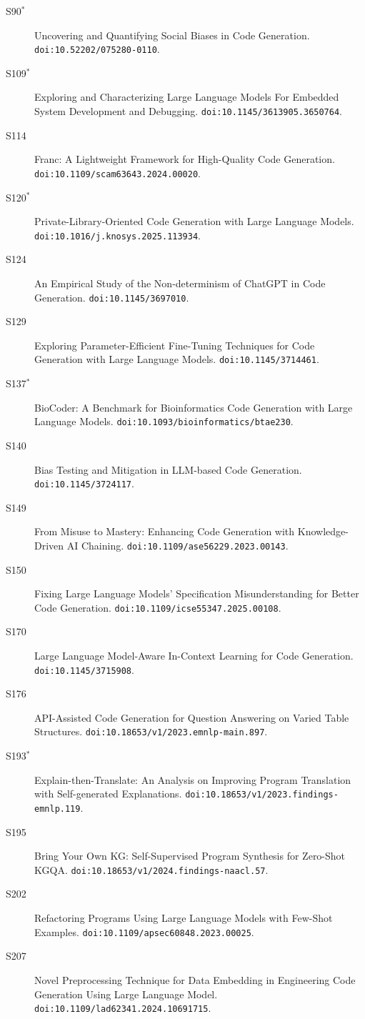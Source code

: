 {\begin{description}
\item[S90$^\ast$] Uncovering and Quantifying Social Biases in Code Generation. \texttt{doi:10.52202/075280-0110}.
\item[S109$^\ast$] Exploring and Characterizing Large Language Models For Embedded System Development and Debugging. \texttt{doi:10.1145/3613905.3650764}.
\item[S114] Franc: A Lightweight Framework for High-Quality Code Generation. \texttt{doi:10.1109/scam63643.2024.00020}.
\item[S120$^\ast$] Private-Library-Oriented Code Generation with Large Language Models. \texttt{doi:10.1016/j.knosys.2025.113934}.
\item[S124] An Empirical Study of the Non-determinism of ChatGPT in Code Generation. \texttt{doi:10.1145/3697010}.
\item[S129] Exploring Parameter-Efficient Fine-Tuning Techniques for Code Generation with Large Language Models. \texttt{doi:10.1145/3714461}.
\item[S137$^\ast$] BioCoder: A Benchmark for Bioinformatics Code Generation with Large Language Models. \texttt{doi:10.1093/bioinformatics/btae230}.
\item[S140] Bias Testing and Mitigation in LLM-based Code Generation. \texttt{doi:10.1145/3724117}.
\item[S149] From Misuse to Mastery: Enhancing Code Generation with Knowledge-Driven AI Chaining. \texttt{doi:10.1109/ase56229.2023.00143}.
\item[S150] Fixing Large Language Models' Specification Misunderstanding for Better Code Generation. \texttt{doi:10.1109/icse55347.2025.00108}.
\item[S170] Large Language Model-Aware In-Context Learning for Code Generation. \texttt{doi:10.1145/3715908}.
\item[S176] API-Assisted Code Generation for Question Answering on Varied Table Structures. \texttt{doi:10.18653/v1/2023.emnlp-main.897}.
\item[S193$^\ast$] Explain-then-Translate: An Analysis on Improving Program Translation with Self-generated Explanations. \texttt{doi:10.18653/v1/2023.findings-emnlp.119}.
\item[S195] Bring Your Own KG: Self-Supervised Program Synthesis for Zero-Shot KGQA. \texttt{doi:10.18653/v1/2024.findings-naacl.57}.
\item[S202] Refactoring Programs Using Large Language Models with Few-Shot Examples. \texttt{doi:10.1109/apsec60848.2023.00025}.
\item[S207] Novel Preprocessing Technique for Data Embedding in Engineering Code Generation Using Large Language Model. \texttt{doi:10.1109/lad62341.2024.10691715}.

\end{description}}
